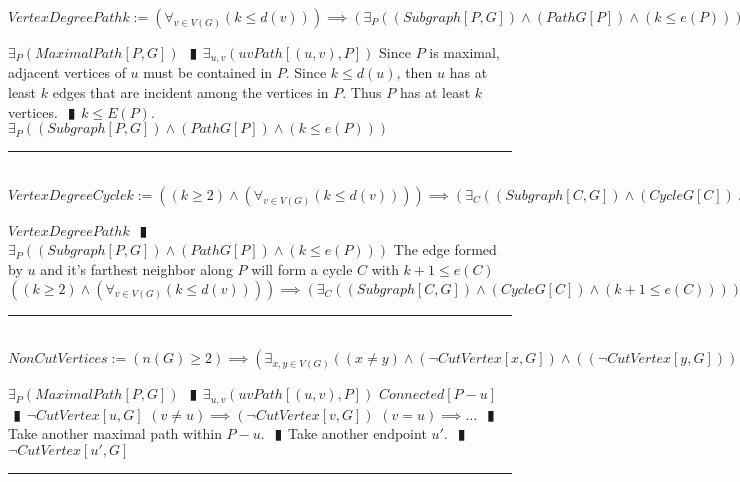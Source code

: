 \documentclass{book}
\newcommand{\abr}{:=}
\newcommand{\pipe}{$\phantom{(}\vrectangleblack\phantom{)}$}
\newcommand{\pr}[1]{\left(#1\right)}
\begin{document}
$VertexDegreePathk \abr \pr{\forall_{v \in V(G)}\pr{k \leq d(v)}} \implies \pr{\exists_{P}\pr{(Subgraph[P, G]) \land (PathG[P]) \land \pr{k \leq e(P)}}}$
\begin{enumerate}
  \lit $\exists_{P}(MaximalPath[P, G])$ \pipe $\exists_{u, v}\pr{uvPath[(u, v), P]}$
  \lit Since $P$ is maximal, adjacent vertices of $u$ must be contained in $P$.
  \lit Since $k \leq d(u)$, then $u$ has at least $k$ edges that are incident among the vertices in $P$.
  \lit Thus $P$ has at least $k$ vertices. \pipe $k \leq E(P)$.
  \lit $\exists_{P}\pr{(Subgraph[P, G]) \land (PathG[P]) \land \pr{k \leq e(P)}}$
\end{enumerate} \vspace{.75mm} \hrule \vspace{.75mm} \ \\ 

$VertexDegreeCyclek \abr \pr{(k \geq 2) \land \pr{\forall_{v \in V(G)}\pr{k \leq d(v)}}} \implies \pr{\exists_{C}\pr{(Subgraph[C, G]) \land (CycleG[C]) \land \pr{k + 1 \leq e(C)}}}$
\begin{enumerate}
  \lit $VertexDegreePathk$ \pipe $\exists_{P}\pr{(Subgraph[P, G]) \land (PathG[P]) \land \pr{k \leq e(P)}}$
  \lit The edge formed by $u$ and it's farthest neighbor along $P$ will form a cycle $C$ with $k + 1 \leq e(C)$
  \lit $\pr{(k \geq 2) \land \pr{\forall_{v \in V(G)}\pr{k \leq d(v)}}} \implies \pr{\exists_{C}\pr{(Subgraph[C, G]) \land (CycleG[C]) \land \pr{k + 1 \leq e(C)}}}$
\end{enumerate} \vspace{.75mm} \hrule \vspace{.75mm} \ \\ 

$NonCutVertices \abr \pr{n(G) \geq 2} \implies \pr{\exists_{x, y \in V(G)}\pr{(x \neq y) \land (\lnot CutVertex[x, G]) \land \pr{(\lnot CutVertex[y, G])}}}$
\begin{enumerate}
  \lit $\exists_{P}(MaximalPath[P, G])$ \pipe $\exists_{u, v}\pr{uvPath[(u, v), P]}$
  \lit $Connected[P - u]$ \pipe $\lnot CutVertex[u, G]$
  \lit $(v \neq u) \implies (\lnot CutVertex[v, G])$
  \lit $(v = u) \implies \ldots$ \pipe Take another maximal path within $P - u$. \pipe Take another endpoint $u'$. \pipe $\lnot CutVertex[u', G]$
\end{enumerate} \vspace{.75mm} \hrule \vspace{.75mm} \ \\ 
\end{document}
